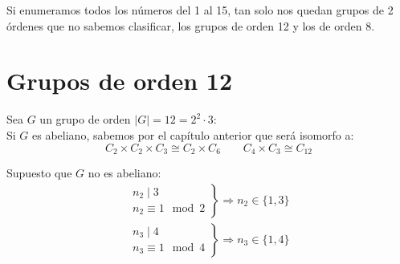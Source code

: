 Si enumeramos todos los números del 1 al 15, tan solo nos quedan grupos de 2 órdenes que no sabemos clasificar, los grupos de orden 12 y los de orden 8.

\section{Grupos de orden 12}
Sea $G$ un grupo de orden $|G| = 12 = 2^2 \cdot 3$:\\

\noindent
Si $G$ es abeliano, sabemos por el capítulo anterior que será isomorfo a:
\begin{equation*}
    C_2\times C_2\times C_3 \cong C_2\times C_6 \qquad C_4\times C_3 \cong C_{12}
\end{equation*}

\noindent
Supuesto que $G$ no es abeliano:
\begin{gather*}
    \left.\begin{array}{r}
            n_2 \mid 3 \\
            n_2 \equiv 1 \mod 2
    \end{array}\right\} \Longrightarrow n_2 \in \{1,3\} \\
    \left.\begin{array}{r}
            n_3 \mid 4 \\
            n_3 \equiv 1 \mod 4
    \end{array}\right\} \Longrightarrow n_3 \in \{1,4\}
\end{gather*}

